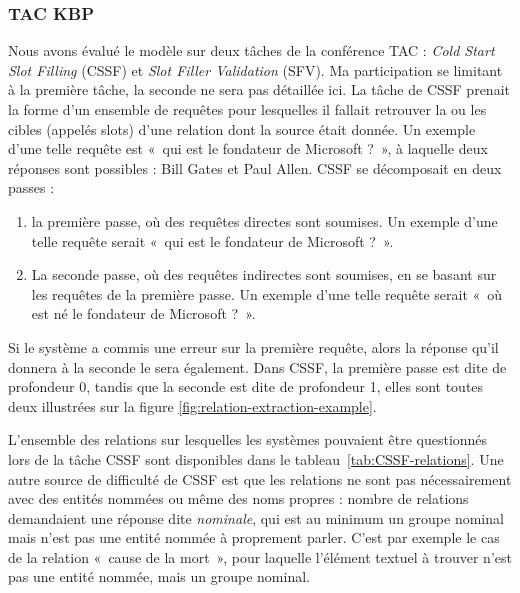 \documentclass[12pt,a4paper,times,twoside,openright]{report}
\begin{document}
            
        \subsubsection{TAC KBP}
        \label{sec:tac-kbp}
Nous avons évalué le modèle sur deux tâches de la conférence TAC : \emph{Cold Start Slot Filling} (CSSF) et \emph{Slot Filler Validation} (SFV). Ma participation se limitant à la première tâche, la seconde ne sera pas détaillée ici. La tâche de CSSF prenait la forme d'un ensemble de requêtes pour lesquelles il fallait retrouver la ou les cibles (appelés slots) d'une relation dont la source était donnée. Un exemple d'une telle requête est «\ qui est le fondateur de Microsoft ?\ », à laquelle deux réponses sont possibles : Bill Gates et Paul Allen. CSSF se décomposait en deux passes :

\begin{enumerate}
    \item la première passe, où des requêtes directes sont soumises.  Un exemple d'une telle requête serait «\ qui est le fondateur de Microsoft ?\ ».
    \item La seconde passe, où des requêtes indirectes sont soumises, en se basant sur les requêtes de la première passe. Un exemple d'une telle requête serait «\ où est né le fondateur de Microsoft ?\ ».
\end{enumerate}

Si le système a commis une erreur sur la première requête, alors la réponse qu'il donnera à la seconde le sera également. Dans CSSF, la première passe est dite de profondeur 0, tandis que la seconde est dite de profondeur 1, elles sont toutes deux illustrées sur la figure \ref{fig:relation-extraction-example}.

L'ensemble des relations sur lesquelles les systèmes pouvaient être questionnés lors de la tâche CSSF sont disponibles dans le tableau\ \ref{tab:CSSF-relations}. Une autre source de difficulté de CSSF est que les relations ne sont pas nécessairement avec des entités nommées ou même des noms propres : nombre de relations demandaient une réponse dite \emph{nominale}, qui est au minimum un groupe nominal mais n'est pas une entité nommée à proprement parler. C'est par exemple le cas de la relation «\ cause de la mort\ », pour laquelle l'élément textuel à trouver n'est pas une entité nommée, mais un groupe nominal.
\end{document}

